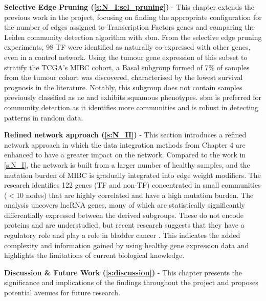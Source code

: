 \textbf{Selective Edge Pruning (\cref{s:N_I:sel_pruning})} - This chapter extends the previous work in the project, focusing on finding the appropriate configuration for the number of edges assigned to Transcription Factors genes and comparing the Leiden community detection algorithm with \acrfull{sbm}. From the selective edge pruning experiments, 98 TF were identified as naturally co-expressed with other genes, even in a control network. Using the tumour gene expression of this subset to stratify the TCGA's MIBC cohort, a Basal subgroup formed of 7\% of samples from the tumour cohort was discovered, characterised by the lowest survival prognosis in the literature. Notably, this subgroup does not contain samples previously classified as \acrlong{ne} and exhibits squamous phenotypes. \acrshort{sbm} is preferred for community detection as it identifies more communities and is robust in detecting patterns in random data.

\textbf{Refined network approach (\cref{s:N_II})} - This section introduces a refined network approach in which the data integration methods from Chapter 4 are enhanced to have a greater impact on the network. Compared to the work in \cref{s:N_I}, the network is built from a larger number of healthy samples, and the mutation burden of MIBC is gradually integrated into edge weight modifiers. The research identifies 122 genes (TF and non-TF) concentrated in small communities (\(<\)10 nodes) that are highly correlated and have a high mutation burden. The analysis uncovers \acrlong{lncRNA} genes, many of which are statistically significantly differentially expressed between the derived subgroups. These do not encode proteins and are understudied, but recent research suggests that they have a regulatory role \citep{Statello2021-md} and play a role in bladder cancer \citep{Zhan2018-um,Logotheti2020-ya}. This indicates the added complexity and information gained by using healthy gene expression data and highlights the limitations of current biological knowledge.

\textbf{Discussion \& Future Work (\cref{s:discussion})} - This chapter presents the significance and implications of the findings throughout the project and proposes potential avenues for future research.



